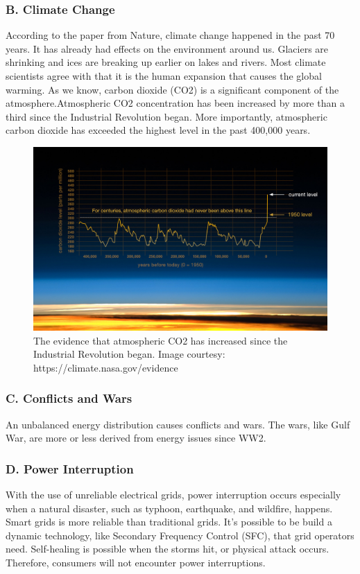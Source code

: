 \documentclass{report}
\begin{document}
\subsubsection{B. Climate Change}
According to the paper from Nature, climate change happened in the past 70 years. It has already had effects on the environment around us. Glaciers are shrinking and ices are breaking up earlier on lakes and rivers. Most climate scientists agree with that it is the human expansion that causes the global warming. As we know, carbon dioxide (CO2) is a significant component of the atmosphere.Atmospheric CO2 concentration has been increased by more than a third since the Industrial Revolution began. More importantly, atmospheric carbon dioxide has exceeded the highest level in the past 400,000 years.\\

\begin{figure}[htbp]
\centering
\includegraphics[width = .891\textwidth]{figure/1_1_1_nasa_co2.jpeg}
\caption{The evidence that atmospheric CO2 has increased since the Industrial Revolution began. Image courtesy: https://climate.nasa.gov/evidence}
\label{1_1_1_nasa_co2}
\end{figure}

\subsubsection{C. Conflicts and Wars}
An unbalanced energy distribution causes conflicts and wars. The wars, like Gulf War, are more or less derived from energy issues since WW2.\\

\subsubsection{D. Power Interruption}
With the use of unreliable electrical grids, power interruption occurs especially when a natural disaster, such as typhoon, earthquake, and wildfire, happens. Smart grids is more reliable than traditional grids. It’s possible to be build a dynamic technology, like Secondary Frequency Control (SFC), that grid operators need. Self-healing is possible when the storms hit, or physical attack occurs. Therefore, consumers will not encounter power interruptions.\\
\end{document}
